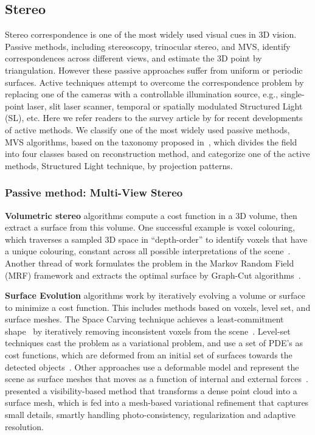 \subsection{Stereo}
Stereo correspondence is one of the most widely used visual cues in 3D vision. Passive methods, including stereoscopy, trinocular stereo, and MVS, identify correspondences across different views, and estimate the 3D point by triangulation. However these passive approaches suffer from uniform or periodic surfaces. Active techniques attempt to overcome the correspondence problem by replacing one of the cameras with a controllable illumination source, e.g., single-point laser, slit laser scanner, temporal or spatially modulated Structured Light (SL), etc. Here we refer readers to the survey article by \citeauthor{blais2004review} for recent developments of active methods. We classify one of the most widely used passive methods, MVS algorithms, based on the taxonomy proposed in~\cite{seitz2006comparison}, which divides the field into four classes based on reconstruction method, and categorize one of the active methods, Structured Light technique, by projection patterns.

\subsubsection{Passive method: Multi-View Stereo}
\textbf{Volumetric stereo} algorithms compute a cost function in a 3D volume, then extract a surface from this volume. One successful example is voxel colouring, which traverses a sampled 3D space in ``depth-order'' to identify voxels that have a unique colouring, constant across all possible interpretations of the scene~\cite{seitz1997photorealistic}. Another thread of work formulates the problem in the Markov Random Field (MRF) framework and extracts the optimal surface by Graph-Cut algorithms~\cite{roy1998maximum,vogiatzis2005multi,vogiatzis2007multiview}.

\textbf{Surface Evolution} algorithms work by iteratively evolving a volume or surface to minimize a cost function. This includes methods based on voxels, level set, and surface meshes. The Space Carving technique achieves a least-commitment shape~\cite{marr1982vision} by iteratively removing inconsistent voxels from the scene~\cite{kutulakos2000theory}. Level-set techniques cast the problem as a variational problem, and use a set of PDE's as cost functions, which are deformed from an initial set of surfaces towards the detected objects~\cite{faugeras2002variational}. Other approaches use a deformable model and represent the scene as surface meshes that moves as a function of internal and external forces~\cite{esteban2004silhouette}. \citeauthor{hiep2009towards} presented a visibility-based method that transforms a dense point cloud into a surface mesh, which is fed into a mesh-based variational refinement that captures small details, smartly handling photo-consistency, regularization and adaptive resolution.

